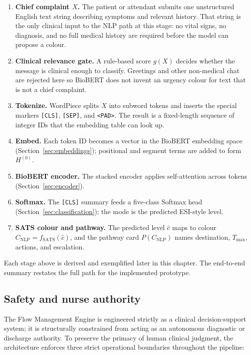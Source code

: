 \begin{enumerate}
\item \textbf{Chief complaint \(X\).} The patient or attendant submits one unstructured English text string describing symptoms and relevant history. That string is the only clinical input to the NLP path at this stage: no vital signs, no diagnosis, and no full medical history are required before the model can propose a colour.
\item \textbf{Clinical relevance gate.} A rule-based score \(g(X)\) decides whether the message is clinical enough to classify. Greetings and other non-medical chat are rejected here so BioBERT does not invent an urgency colour for text that is not a chief complaint.
\item \textbf{Tokenize.} WordPiece splits \(X\) into subword tokens and inserts the special markers \texttt{[CLS]}, \texttt{[SEP]}, and \texttt{<PAD>}. The result is a fixed-length sequence of integer IDs that the embedding table can look up.
\item \textbf{Embed.} Each token ID becomes a vector in the BioBERT embedding space (Section~\ref{sec:embeddings}); positional and segment terms are added to form \(H^{(0)}\).
\item \textbf{BioBERT encoder.} The stacked encoder applies self-attention across tokens (Section~\ref{sec:encoder}).
\item \textbf{Softmax.} The \texttt{[CLS]} summary feeds a five-class Softmax head (Section~\ref{sec:classification}); the mode is the predicted ESI-style level.
\item \textbf{SATS colour and pathway.} The predicted level \(\hat{c}\) maps to colour \(C_{\mathrm{NLP}} = f_{\mathrm{SATS}}(\hat{c})\), and the pathway card \(P(C_{\mathrm{NLP}})\) names destination, \(T_{\max}\), actions, and escalation.
\end{enumerate}

Each stage above is derived and exemplified later in this chapter. The end-to-end summary restates the full path for the implemented prototype.

\subsection{Safety and nurse authority}

The Flow Management Engine is engineered strictly as a clinical decision-support system; it is structurally constrained from acting as an autonomous diagnostic or discharge authority. To preserve the primacy of human clinical judgment, the architecture enforces three strict operational boundaries throughout the pipeline:

